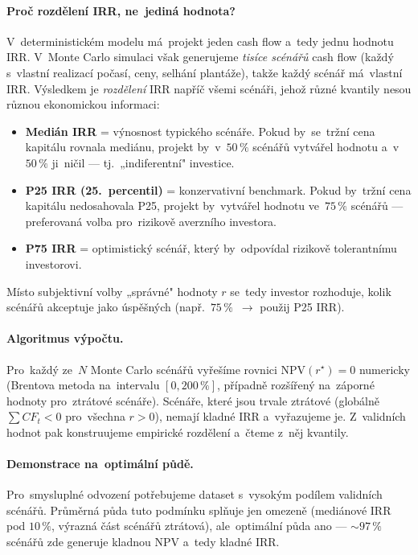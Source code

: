 \paragraph{Proč rozdělení IRR, ne~jediná hodnota?}
V~deterministickém modelu má~projekt jeden cash flow a~tedy jednu
hodnotu IRR. V~Monte Carlo simulaci však generujeme \emph{tisíce
scénářů} cash flow (každý s~vlastní realizací počasí, ceny, selhání
plantáže), takže každý scénář má~vlastní IRR. Výsledkem je
\emph{rozdělení} IRR napříč všemi scénáři, jehož různé kvantily
nesou různou ekonomickou informaci:
\begin{itemize}
    \item \textbf{Medián IRR} = výnosnost typického scénáře. Pokud by~se~tržní
          cena kapitálu rovnala mediánu, projekt by~v~$50\,\%$ scénářů
          vytvářel hodnotu a~v~$50\,\%$ ji~ničil --- tj.~„indiferentní"
          investice.
    \item \textbf{P25 IRR (25.~percentil)} = konzervativní benchmark.
          Pokud by~tržní cena kapitálu nedosahovala P25, projekt
          by~vytvářel hodnotu ve~$75\,\%$ scénářů --- preferovaná volba
          pro~rizikově averzního investora.
    \item \textbf{P75 IRR} = optimistický scénář, který by~odpovídal
          rizikově tolerantnímu investorovi.
\end{itemize}
Místo subjektivní volby „správné" hodnoty $r$ se~tedy investor rozhoduje,
kolik scénářů akceptuje jako úspěšných (např.~$75\,\%$~$\to$ použij P25 IRR).

\paragraph{Algoritmus výpočtu.}
Pro~každý ze~$N$ Monte Carlo scénářů vyřešíme rovnici
$\mathrm{NPV}(r^{\star}) = 0$ numericky (Brentova metoda na~intervalu
$[0, 200\,\%]$, případně rozšířený na~záporné hodnoty pro~ztrátové
scénáře). Scénáře, které jsou trvale ztrátové
(globálně $\sum CF_t < 0$ pro~všechna $r > 0$), nemají kladné IRR a~vyřazujeme
je. Z~validních hodnot pak konstruujeme empirické rozdělení
a~čteme z~něj kvantily.

\paragraph{Demonstrace na~optimální půdě.}
Pro~smysluplné odvození potřebujeme dataset s~vysokým podílem validních
scénářů. Průměrná půda tuto podmínku splňuje jen omezeně (mediánové
IRR pod $10\,\%$, výrazná část scénářů ztrátová), ale~optimální
půda ano --- $\sim 97\,\%$ scénářů zde generuje kladnou NPV
a~tedy kladné IRR.

